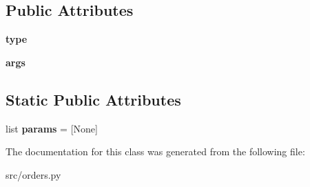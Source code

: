 \subsection*{\-Public \-Attributes}
\begin{DoxyCompactItemize}
\item 
\hypertarget{classsrc_1_1orders_1_1_order_aa520998f666493616c058406413cc7dc}{{\bfseries type}}\label{classsrc_1_1orders_1_1_order_aa520998f666493616c058406413cc7dc}

\item 
\hypertarget{classsrc_1_1orders_1_1_order_a0b890f5803ed3e710da29b4d612967dc}{{\bfseries args}}\label{classsrc_1_1orders_1_1_order_a0b890f5803ed3e710da29b4d612967dc}

\end{DoxyCompactItemize}
\subsection*{\-Static \-Public \-Attributes}
\begin{DoxyCompactItemize}
\item 
\hypertarget{classsrc_1_1orders_1_1_order_aa15ac874941c1dd31e60be3ba4a89e91}{list {\bfseries params} = \mbox{[}\-None\mbox{]}}\label{classsrc_1_1orders_1_1_order_aa15ac874941c1dd31e60be3ba4a89e91}

\end{DoxyCompactItemize}


\-The documentation for this class was generated from the following file\-:\begin{DoxyCompactItemize}
\item 
src/orders.\-py\end{DoxyCompactItemize}
